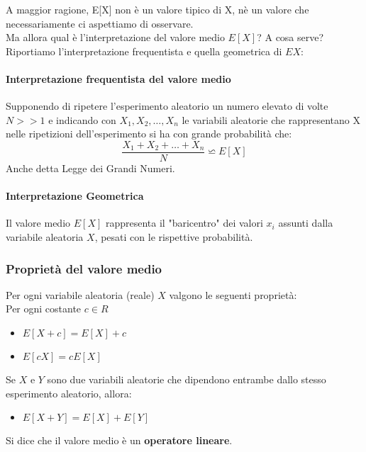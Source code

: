 
A maggior ragione, E[X] non è un valore tipico di X, nè un valore che necessariamente
ci aspettiamo di osservare.
\\ Ma allora qual è l'interpretazione del valore medio $E[X]$? A cosa serve?
Riportiamo l'interpretazione frequentista e quella geometrica di $E{X}$:
\paragraph{Interpretazione frequentista del valore medio}
Supponendo di ripetere l'esperimento aleatorio un numero elevato di volte $N >> 1$
e indicando con $X_1, X_2, \dots, X_n$ le variabili aleatorie che rappresentano X nelle
ripetizioni dell'esperimento si ha con grande probabilità che:
\[
	\frac{X_1 + X_2 + \dots + X_n}{N} \backsimeq  E[X]
\]
Anche detta Legge dei Grandi Numeri.

\paragraph{Interpretazione Geometrica}
Il valore medio $E[X]$ rappresenta il "baricentro" dei valori $x_i$ assunti dalla variabile aleatoria $X$, pesati
con le rispettive probabilità.

\subsubsection{Proprietà del valore medio}
Per ogni variabile aleatoria (reale) $X$ valgono le seguenti proprietà:
\\Per ogni costante $c \in R$
\begin{itemize}
	\item $E[X + c] = E[X] + c$
	\item $E[cX] = c E[X]$
\end{itemize}
Se $X$ e $Y$ sono due variabili aleatorie che dipendono entrambe dallo
stesso esperimento aleatorio, allora:
\begin{itemize}
	\item $E[X+Y] = E[X] + E[Y]$
\end{itemize}
Si dice che il valore medio è un\textbf{ operatore lineare}.

